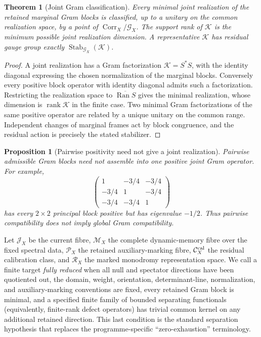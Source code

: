 \documentclass[11pt]{article}
\newtheorem{theorem}{Theorem}[section]
\newtheorem{proposition}[proposition]{Proposition}
\theoremstyle{definition}
\theoremstyle{remark}
\theoremstyle{definition}
\theoremstyle{remark}
\newcommand{\rank}{\operatorname{rank}}
\newcommand{\Ran}{\operatorname{Ran}}
\newcommand{\Corr}{\operatorname{Corr}}
\newcommand{\Stab}{\operatorname{Stab}}
\begin{document}
\begin{theorem}[Joint Gram classification]
\label{thm:supp-common-source}
Every minimal joint realization of the retained marginal Gram blocks is
classified, up to a unitary on the common realization space, by a point of
$\Corr_X/\mathcal G_X$.  The support rank of $\mathcal K$ is the minimum
possible joint realization dimension.  A representative $\mathcal K$ has
residual gauge group exactly $\Stab_{\mathcal G_X}(\mathcal K)$.
\end{theorem}

\begin{proof}
A joint realization has a Gram factorization $\mathcal K=S^*S$, with the
identity diagonal expressing the chosen normalization of the marginal blocks.
Conversely every positive block operator with identity diagonal admits such a
factorization.  Restricting the realization space to $\overline{\Ran S}$ gives
the minimal realization, whose dimension is $\rank\mathcal K$ in the finite
case.  Two minimal Gram factorizations of the same positive operator are
related by a unique unitary on the common range.  Independent changes of
marginal frames act by block congruence, and the residual action is precisely
the stated stabilizer.
\end{proof}

\begin{proposition}[Pairwise positivity need not give a joint realization]
\label{cth:supp-pairwise-not-global}
Pairwise admissible Gram blocks need not assemble into one positive joint Gram
operator.  For example,
\begin{equation}
\begin{pmatrix}
1&-3/4&-3/4\\
-3/4&1&-3/4\\
-3/4&-3/4&1
\end{pmatrix}
\label{eq:supp-three-block-counterexample}
\end{equation}
has every $2\times2$ principal block positive but has eigenvalue $-1/2$.
Thus pairwise compatibility does not imply global Gram compatibility.
\end{proposition}

Let $\mathcal J_X$ be the current fibre, $\mathcal M_X$ the complete
dynamic-memory fibre over the fixed spectral data, $\mathcal P_X$ the retained
auxiliary-marking fibre, $\mathcal C_X^{\rm cal}$ the residual calibration
class, and $\mathcal R_X$ the marked monodromy representation space.  We call a
finite target \emph{fully reduced} when all null and spectator directions have
been quotiented out, the domain, weight, orientation, determinant-line, normalization, and auxiliary-marking
conventions are fixed, every retained Gram block is minimal, and a specified
finite family of bounded separating functionals (equivalently, finite-rank
defect operators) has trivial common kernel on any additional retained
direction.  This last condition is the standard separation hypothesis that
replaces the programme-specific ``zero-exhaustion'' terminology.
\end{document}
